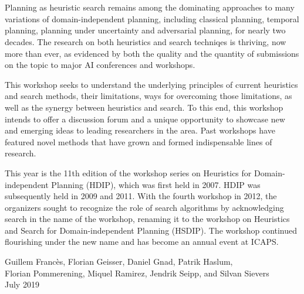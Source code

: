 \section*{}
Planning as heuristic search remains among the dominating approaches to many
variations of domain-independent planning, including classical planning,
temporal planning, planning under uncertainty and adversarial planning, for
nearly two decades. The research on both heuristics and search techniqes is
thriving, now more than ever, as evidenced by both the quality and the quantity
of submissions on the topic to major AI conferences and workshops.

This workshop seeks to understand the underlying principles of current
heuristics and search methods, their limitations, ways for overcoming those
limitations, as well as the synergy between heuristics and search. To this end,
this workshop intends to offer a discussion forum and a unique opportunity to
showcase new and emerging ideas to leading researchers in the area. Past
workshops have featured novel methods that have grown and formed indispensable
lines of research.

This year is the 11th edition of the workshop series on Heuristics for 
Domain-independent Planning (HDIP), which was first held in 2007. HDIP 
was subsequently held in 2009 and 2011. With the fourth workshop in 
2012, the organizers sought to recognize the role of search algorithms 
by acknowledging search in the name of the workshop, renaming it to 
the workshop on Heuristics and Search for Domain-independent Planning 
(HSDIP). The workshop continued flourishing under the new name and has 
become an annual event at ICAPS.

\bigskip
\begin{flushright}
Guillem Franc\`es,
Florian Geisser,
Daniel Gnad,
Patrik Haslum,\\
Florian Pommerening,
Miquel Ramirez,
Jendrik Seipp, 
and Silvan Sievers
\\
July 2019
\end{flushright}
